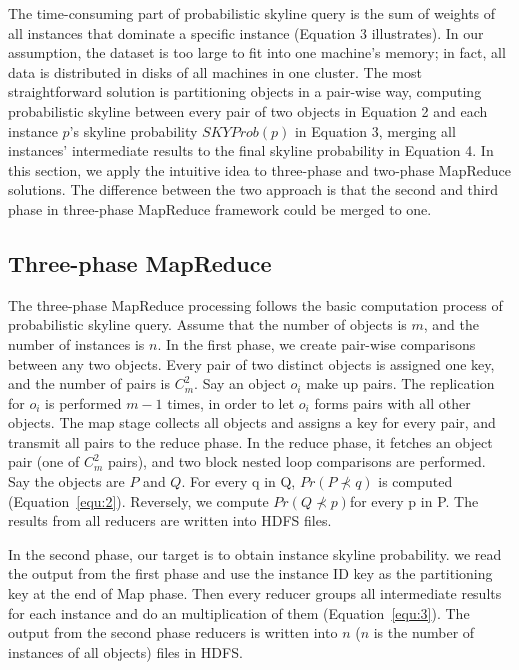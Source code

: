 The time-consuming part of probabilistic skyline query is the sum of weights of all instances that dominate a specific instance (Equation 3 illustrates). In our assumption, the dataset is too large to fit into one machine's memory; in fact, all data is distributed in disks of all machines in one cluster. The most straightforward solution is partitioning objects in a pair-wise way, computing probabilistic skyline between every pair of two objects in Equation 2 and each instance \(p\)'s skyline probability \(SKYProb(p)\) in Equation 3, merging all instances' intermediate results to the final skyline probability in Equation 4. In this section, we apply the intuitive idea to three-phase and two-phase MapReduce solutions. The difference between the two approach is that the second and third phase in three-phase MapReduce framework could be merged to one.

\subsection{Three-phase MapReduce}
The three-phase MapReduce processing follows the basic computation process of probabilistic skyline query. Assume that the number of objects is \(m\), and the number of instances is \(n\). In the first phase, we create pair-wise comparisons between any two objects. Every pair of two distinct objects is assigned one key, and the number of pairs is \(C_{m}^{2}\). Say an object $o_i$ make up pairs. The replication for $o_i$ is performed $m-1$ times, in order to let $o_i$ forms pairs with all other objects. The map stage collects all objects and assigns a key for every pair, and transmit all pairs to the reduce phase.
In the reduce phase, it fetches an object pair (one of $C_{m}^{2}$ pairs), and two block nested loop comparisons are performed. Say the objects are \(P\) and \(Q\). For every q in Q, $Pr(P\nprec q) $ is computed (Equation~\ref{equ:2}). Reversely, we compute $Pr( Q\nprec p) $for every p in P. The results from all reducers are written into HDFS files.


In the second phase, our target is to obtain instance skyline probability. we read the output from the first phase and use the instance ID key as the partitioning key at the end of Map phase. Then every reducer groups all intermediate results for each instance and do an multiplication of them (Equation~\ref{equ:3}). The output from the second phase reducers is written into \(n\) (\(n\) is the number of instances of all objects) files in HDFS.

